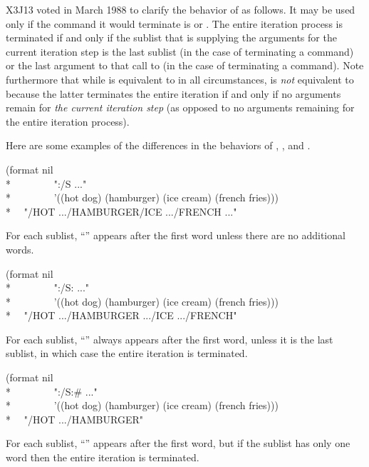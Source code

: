 \begin{flushdesc}
\begin{new}
X3J13 voted in March 1988
to clarify the behavior of \cd{{\Xtilde}:{\Xcircumflex}} as follows.
It may be used only if the command it would terminate is \cd{{\Xtilde}:{\Xlbrace}}
or \cd{{\Xtilde}:{\Xatsign}{\Xlbrace}}.  The entire iteration process is terminated
if and only if the sublist that is supplying the arguments for the current iteration step
is the last sublist (in the case of terminating a \cd{{\Xtilde}:{\Xlbrace}} command)
or the last argument to that call to  (in the
case of terminating a \cd{{\Xtilde}:{\Xatsign}{\Xlbrace}} command).
Note furthermore that while \cd{{\Xtilde}{\Xcircumflex}} is equivalent
to \cd{{\Xtilde}\#{\Xcircumflex}} in all circumstances,
\cd{{\Xtilde}:{\Xcircumflex}} is {\it not} equivalent
to \cd{{\Xtilde}:\#{\Xcircumflex}} because the latter terminates the entire iteration
if and only if no arguments remain for {\it the current iteration step}
(as opposed to no arguments remaining for the entire iteration process).

Here are some examples of the differences in the
behaviors of \cd{{\Xtilde}{\Xcircumflex}}, \cd{{\Xtilde}:{\Xcircumflex}},
and \cd{{\Xtilde}:\#{\Xcircumflex}}.
\begin{lisp}
(format nil \\*
~~~~~~~~"{\Xtilde}:{\Xlbrace}/{\Xtilde}S{\Xtilde}{\Xcircumflex} ...{\Xtilde}{\Xrbrace}" \\*
~~~~~~~~'((hot dog) (hamburger) (ice cream) (french fries))) \\*
~\EV~"/HOT .../HAMBURGER/ICE .../FRENCH ..."
\end{lisp}
For each sublist, ``'' appears after the first word unless there are no
additional words.
\begin{lisp}
(format nil \\*
~~~~~~~~"{\Xtilde}:{\Xlbrace}/{\Xtilde}S{\Xtilde}:{\Xcircumflex} ...{\Xtilde}{\Xrbrace}" \\*
~~~~~~~~'((hot dog) (hamburger) (ice cream) (french fries))) \\*
~\EV~"/HOT .../HAMBURGER .../ICE .../FRENCH"
\end{lisp}
For each sublist, ``'' always appears after the first word, unless it is the
last sublist, in which case the entire iteration is terminated.
\begin{lisp}
(format nil \\*
~~~~~~~~"{\Xtilde}:{\Xlbrace}/{\Xtilde}S{\Xtilde}:\#{\Xcircumflex} ...{\Xtilde}{\Xrbrace}" \\*
~~~~~~~~'((hot dog) (hamburger) (ice cream) (french fries))) \\*
~\EV~"/HOT .../HAMBURGER"
\end{lisp}
For each sublist, ``'' appears after the first word, but if the sublist
has only one word then the entire iteration is terminated.
\end{new}


\end{flushdesc}
